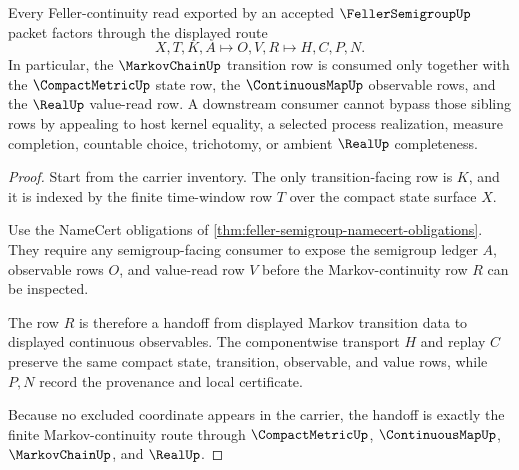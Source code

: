 \begin{theorem}
\label{thm:feller-semigroup-markov-continuity-handoff}
Every Feller-continuity read exported by an accepted $\FellerSemigroupUp$ packet factors through the displayed route
$$
X,T,K,A \longmapsto O,V,R \longmapsto H,C,P,N .
$$
In particular, the $\MarkovChainUp$ transition row is consumed only together with the $\CompactMetricUp$ state row, the $\ContinuousMapUp$ observable rows, and the $\RealUp$ value-read row. A downstream consumer cannot bypass those sibling rows by appealing to host kernel equality, a selected process realization, measure completion, countable choice, trichotomy, or ambient $\RealUp$ completeness.
\end{theorem}
\begin{proof}
Start from the carrier inventory. The only transition-facing row is $K$, and it is indexed by the finite time-window row $T$ over the compact state surface $X$.

Use the NameCert obligations of \autoref{thm:feller-semigroup-namecert-obligations}. They require any semigroup-facing consumer to expose the semigroup ledger $A$, observable rows $O$, and value-read row $V$ before the Markov-continuity row $R$ can be inspected.

The row $R$ is therefore a handoff from displayed Markov transition data to displayed continuous observables. The componentwise transport $H$ and replay $C$ preserve the same compact state, transition, observable, and value rows, while $P,N$ record the provenance and local certificate.

Because no excluded coordinate appears in the carrier, the handoff is exactly the finite Markov-continuity route through $\CompactMetricUp$, $\ContinuousMapUp$, $\MarkovChainUp$, and $\RealUp$.
\end{proof}



